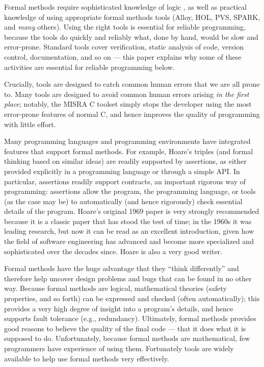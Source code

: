 \documentclass{article}
\begin{document}
Formal methods require sophisticated knowledge of logic \cite{cbc}, as well as practical knowledge of using appropriate formal methods tools (Alloy, HOL, PVS, SPARK, and \emph{many\/} others). Using the right tools is essential for reliable programming, because the tools do quickly and reliably what, done by hand, would be slow and error-prone. Standard tools cover verification, static analysis of code, version control, documentation, and so on --- this paper explains why some of these activities are essential for reliable programming below. 

Crucially, tools are designed to catch common human errors that we are all prone to. Many tools are designed to avoid common human errors arising \emph{in the first place\/}; notably, the MISRA C toolset simply stops the developer using the most error-prone features of normal C, and hence improves the quality of programming with little effort.

Many programming languages and programming environments have integrated features that support formal methods. For example, Hoare's triples \cite{hoare} (and formal thinking based on similar ideas) are readily supported by assertions, as either provided explicitly in a programming language or through a simple API\@. In particular, assertions readily support contracts, an important rigorous way of programming: assertions allow the program, the programming language, or tools (as the case may be) to automatically (and hence rigorously) check essential details of the program. Hoare's original 1969 paper \cite{hoare} is very strongly recommended because it is a classic paper that has stood the test of time; in the 1960s it was leading research, but now it can be read as an excellent introduction, given how the field of software engineering has advanced and become more specialized and sophisticated over the decades since. Hoare is also a very good writer.

Formal methods have the huge advantage that they ``think differently'' and therefore help uncover design problems and bugs that can be found in no other way. Because formal methods are logical, mathematical theories (safety properties, and so forth) can be expressed and checked (often automatically); this provides a very high degree of insight into a program's details, and hence supports fault tolerance (e.g., redundancy). Ultimately, formal methods provides good reasons to believe the quality of the final code --- that it does what it is supposed to do. Unfortunately, because formal methods are mathematical, few programmers have experience of using them. Fortunately tools are widely available to help use formal methods very effectively.
\end{document}
